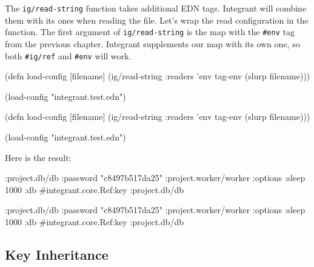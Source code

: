 \fi

The \verb|ig/read-string| function takes additional EDN tags. Integrant will combine them with its ones when reading the file. Let's wrap the read configuration in the function. The first argument of \verb|ig/read-string| is the map with the \verb|#env| tag from the previous chapter. Integrant supplements our map with its own one, so both \verb|#ig/ref| and \verb|#env| will work.

\ifnarrow

\begin{english}
  \begin{clojure}
(defn load-config [filename]
  (ig/read-string
    {:readers {'env tag-env}}
    (slurp filename)))

(load-config "integrant.test.edn")
  \end{clojure}
\end{english}

\else

\begin{english}
  \begin{clojure}
(defn load-config [filename]
  (ig/read-string {:readers {'env tag-env}}
                  (slurp filename)))

(load-config "integrant.test.edn")
  \end{clojure}
\end{english}

\fi

\noindent
Here is the result:

\ifnarrow

\begin{english}
  \begin{clojure}
{:project.db/db
 {:password "c8497b517da25"}
 :project.worker/worker
 {:options {:sleep 1000}
  :db
  #integrant.core.Ref{:key
                      :project.db/db}}}
  \end{clojure}
\end{english}

\else

\begin{english}
  \begin{clojure}
{:project.db/db {:password "c8497b517da25"}
 :project.worker/worker
 {:options {:sleep 1000}
  :db #integrant.core.Ref{:key :project.db/db}}}
  \end{clojure}
\end{english}

\fi

\subsection{Key Inheritance}

